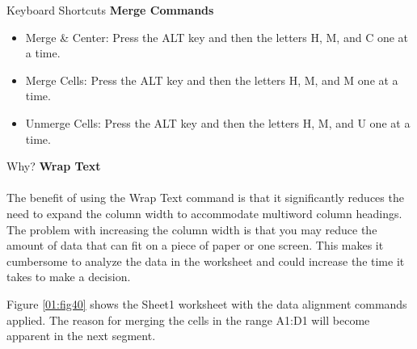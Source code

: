 \begin{center}
	\begin{shtcutbox}{Keyboard Shortcuts}
		\textbf{Merge Commands}
		\\
		\begin{itemize}
			\setlength{\itemsep}{0pt}
			\setlength{\parskip}{0pt}
			\setlength{\parsep}{0pt}
			
			\item Merge \& Center: Press the ALT key and then the letters H, M, and C one at a time.
			\item Merge Cells: Press the ALT key and then the letters H, M, and M one at a time.
			\item Unmerge Cells: Press the ALT key and then the letters H, M, and U one at a time.
			
		\end{itemize}
	\end{shtcutbox}
\end{center}

\begin{center}
	\begin{infobox}{Why?}
		\textbf{Wrap Text}
		\\
		\\
		The benefit of using the Wrap Text command is that it significantly reduces the need to expand the column width to accommodate multiword column headings. The problem with increasing the column width is that you may reduce the amount of data that can fit on a piece of paper or one screen. This makes it cumbersome to analyze the data in the worksheet and could increase the time it takes to make a decision.
	\end{infobox}
\end{center}

Figure \ref{01:fig40} shows the Sheet1 worksheet with the data alignment commands applied. The reason for merging the cells in the range \textsf{A1:D1} will become apparent in the next segment.

